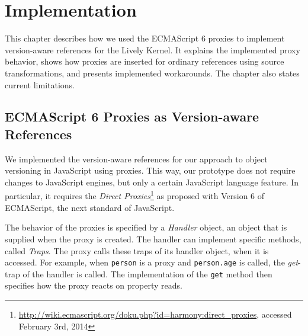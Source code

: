 \chapter{Implementation} \label{chapter:IMPLEMENTATION}

This chapter describes how we used the ECMAScript 6 proxies to implement version-aware references for the Lively Kernel.
It explains the implemented proxy behavior, shows how proxies are inserted for ordinary references using source transformations, and presents implemented workarounds.
The chapter also states current limitations.









\section{ECMAScript 6 Proxies as Version-aware References} \label{sec:IMPLEMENTATION:1}

We implemented the version-aware references for our approach to object versioning in JavaScript using proxies.
This way, our prototype does not require changes to JavaScript engines, but only a certain JavaScript language feature.
In particular, it requires the \emph{Direct Proxies}\footnote{\url{http://wiki.ecmascript.org/doku.php?id=harmony:direct_proxies}, accessed February 3rd, 2014} as proposed with Version 6 of ECMAScript, the next standard of JavaScript.

The behavior of the proxies is specified by a \emph{Handler} object, an object that is supplied when the proxy is created.
The handler can implement specific methods, called \emph{Traps}.
The proxy calls these traps of its handler object, when it is accessed.
For example, when \lstinline{person} is a proxy and \lstinline{person.age} is called, the \emph{get}-trap of the handler is called.
The implementation of the \lstinline{get} method then specifies how the proxy reacts on property reads.

